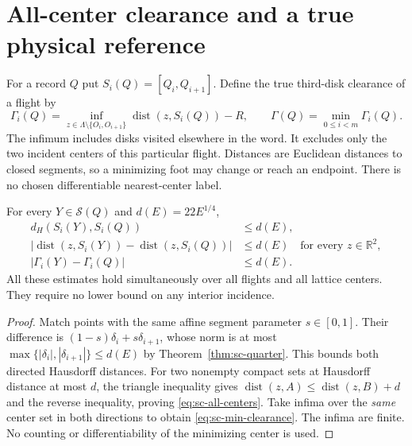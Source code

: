 \section{All-center clearance and a true physical reference}
\label{sec:sc-clearance}
For a record $Q$ put $S_i(Q)=[Q_i,Q_{i+1}]$. Define the true third-disk clearance of a flight by
\begin{equation}\label{eq:sc-clearance-definition}
 \Gamma_i(Q)=\inf_{z\in\Lambda\setminus\{O_i,O_{i+1}\}}
          \operatorname{dist}(z,S_i(Q))-R,\qquad
 \Gamma(Q)=\min_{0\le i<m}\Gamma_i(Q).
\end{equation}
The infimum includes disks visited elsewhere in the word. It excludes only the two incident centers of this particular flight. Distances are Euclidean distances to closed segments, so a minimizing foot may change or reach an endpoint. There is no chosen differentiable nearest-center label.

\begin{sctheorem}\label{thm:sc-clearance}
For every $Y\in\mathcal S(Q)$ and $d(E)=22E^{1/4}$,
\begin{align}
 d_H(S_i(Y),S_i(Q))&\le d(E),\label{eq:sc-hausdorff}\\
 \big|\operatorname{dist}(z,S_i(Y))-\operatorname{dist}(z,S_i(Q))\big|
      &\le d(E)\quad\text{for every }z\in\mathbb R^2,\label{eq:sc-all-centers}\\
 |\Gamma_i(Y)-\Gamma_i(Q)|&\le d(E).\label{eq:sc-min-clearance}
\end{align}
All these estimates hold simultaneously over all flights and all lattice centers. They require no lower bound on any interior incidence.
\end{sctheorem}
\begin{proof}
Match points with the same affine segment parameter $s\in[0,1]$. Their difference is $(1-s)\delta_i+s\delta_{i+1}$, whose norm is at most $\max\{|\delta_i|,|\delta_{i+1}|\}\le d(E)$ by Theorem~\ref{thm:sc-quarter}. This bounds both directed Hausdorff distances. For two nonempty compact sets at Hausdorff distance at most $d$, the triangle inequality gives $\operatorname{dist}(z,A)\le\operatorname{dist}(z,B)+d$ and the reverse inequality, proving \eqref{eq:sc-all-centers}. Take infima over the \emph{same} center set in both directions to obtain \eqref{eq:sc-min-clearance}. The infima are finite. No counting or differentiability of the minimizing center is used.
\end{proof}

